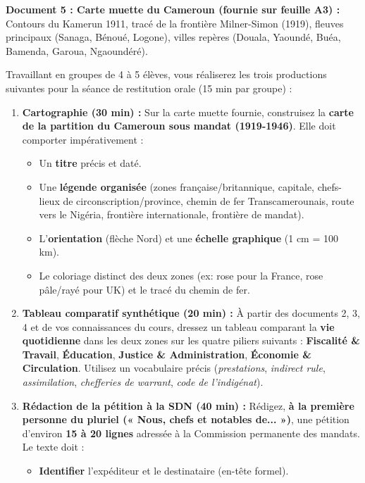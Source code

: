 \documentclass[11pt]{article}
\newcounter{popsec}
\newcounter{popsub}
\newcommand{\courssub}[1]{%
  \stepcounter{popsub}%
  \par\vspace{9pt}\noindent{\popxbold\fontsize{11.5}{13}\selectfont\color{popink}{\color{poporange}\thepopsec.\thepopsub}\hspace{6pt}#1}\par\nopagebreak\vspace{4pt}
}
\begin{document}
\medskip
\noindent \textbf{Document 5 : Carte muette du Cameroun (fournie sur feuille A3) :} Contours du Kamerun 1911, tracé de la frontière Milner-Simon (1919), fleuves principaux (Sanaga, Bénoué, Logone), villes repères (Douala, Yaoundé, Buéa, Bamenda, Garoua, Ngaoundéré).

\courssub{Consignes}
\noindent Travaillant en groupes de 4 à 5 élèves, vous réaliserez les trois productions suivantes pour la séance de restitution orale (15 min par groupe) :

\begin{enumerate}
    \item \textbf{Cartographie (30 min) :} Sur la carte muette fournie, construisez la \textbf{carte de la partition du Cameroun sous mandat (1919-1946)}. Elle doit comporter impérativement :
    \begin{itemize}
        \item Un \textbf{titre} précis et daté.
        \item Une \textbf{légende organisée} (zones française/britannique, capitale, chefs-lieux de circonscription/province, chemin de fer Transcamerounais, route vers le Nigéria, frontière internationale, frontière de mandat).
        \item L'\textbf{orientation} (flèche Nord) et une \textbf{échelle graphique} (1 cm = 100 km).
        \item Le coloriage distinct des deux zones (ex: rose pour la France, rose pâle/rayé pour UK) et le tracé du chemin de fer.
    \end{itemize}
    \item \textbf{Tableau comparatif synthétique (20 min) :} À partir des documents 2, 3, 4 et de vos connaissances du cours, dressez un tableau comparant la \textbf{vie quotidienne} dans les deux zones sur les quatre piliers suivants : \textbf{Fiscalité \& Travail}, \textbf{Éducation}, \textbf{Justice \& Administration}, \textbf{Économie \& Circulation}. Utilisez un vocabulaire précis (\emph{prestations}, \emph{indirect rule}, \emph{assimilation}, \emph{chefferies de warrant}, \emph{code de l'indigénat}).
    \item \textbf{Rédaction de la pétition à la SDN (40 min) :} Rédigez, \textbf{à la première personne du pluriel (« Nous, chefs et notables de... »)}, une pétition d'environ \textbf{15 à 20 lignes} adressée à la Commission permanente des mandats. Le texte doit :
    \begin{itemize}
        \item \textbf{Identifier} l'expéditeur et le destinataire (en-tête formel).

\end{itemize}
\end{enumerate}
\end{document}
